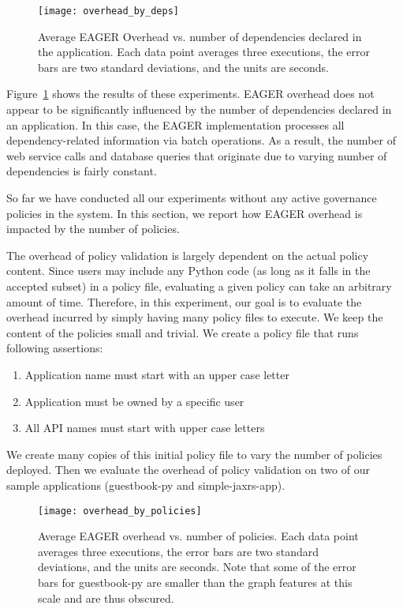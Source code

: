 \begin{figure}
\centering
\texttt{[image: overhead\_by\_deps]}
\caption{Average EAGER Overhead vs. number of dependencies declared in the
application.  Each data point averages three executions, the error bars are
two standard deviations, and the units are seconds.}
\label{fig:overhead_by_deps}
\vspace{-0.2in}
\end{figure}

Figure~\ref{fig:overhead_by_deps} shows the results of these experiments. 
EAGER overhead does not appear to be significantly
influenced by the number of dependencies declared in an application. 
In this case, the EAGER implementation processes
all dependency-related information via batch operations. 
As a result, the number of web service calls and database queries that originate 
due to varying number of dependencies is fairly constant. 

So far we have conducted all our experiments without any active governance 
policies in the system. In this section, we report how EAGER overhead
is impacted by the number of policies.

The overhead of policy validation is largely dependent on the actual policy
content. Since users may include any Python code 
(as long as it falls in the accepted subset) in a policy file, evaluating a
given policy can take an arbitrary amount of time.  Therefore, in this
experiment, our goal is to evaluate the overhead incurred by simply having
many policy files to execute. We keep the content of the policies small and
trivial. We create a policy file that runs following assertions:
\begin{enumerate} 
\item Application name must start with an upper case letter
\item Application must be owned by a specific user 
\item All API names must start with upper case letters 
\end{enumerate} We create many copies of this
initial policy file to vary the number of policies deployed. Then we evaluate
the overhead of policy validation on two of our sample applications
(guestbook-py and simple-jaxrs-app). 

\begin{figure}
\centering
\texttt{[image: overhead\_by\_policies]}
\caption{Average EAGER overhead vs. number of policies.  Each data point
averages three executions, the error bars are two standard deviations, and the
units are seconds. Note that some of the error bars for 
guestbook-py are smaller than the graph features at this scale and are thus obscured.}
\label{fig:overhead_by_policies}
\vspace{-0.2in}
\end{figure}

